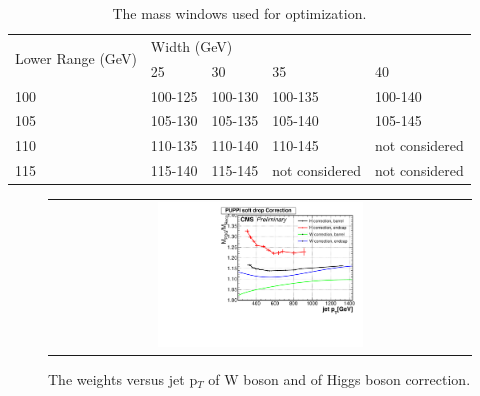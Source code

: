\begin{table}[h!]
  \begin{center}
   \begin{tabular}{|l|l|l|l|l|}
\hline
\multirow{2}{*}{Lower Range (GeV)} & \multicolumn{4}{l|}{Width (GeV)} \\ \cline{2-5} 
                                   & 25     & 30     & 35     & 40    \\ \hline
100                                & 100-125 & 100-130  &  100-135  &  100-140     \\ \hline
105      &  105-130      &   105-135     &  105-140      &    105-145   \\ \hline
110      &  110-135      &   110-140     &  110-145      &    not considered   \\ \hline
115      &  115-140      &   115-145     &  not considered      &    not considered   \\ \hline
\end{tabular}
\caption{The mass windows used for optimization.}
  \end{center}
  \end{table}


\begin{figure}[t]
  \centering
  \begin{tabular}{c}
    \includegraphics[width=0.5\textwidth]{Figures/ap1/recoOne.pdf} 
  \end{tabular}
  \caption{The weights versus jet p$_{T}$ of W boson and of Higgs boson correction.}

\end{figure}


